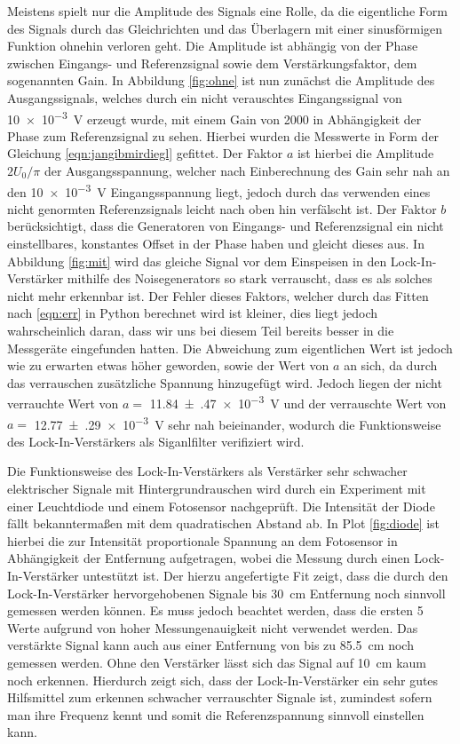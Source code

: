 Meistens spielt nur die Amplitude des Signals eine Rolle, da
die eigentliche Form des Signals durch das Gleichrichten und das Überlagern
mit einer sinusförmigen Funktion ohnehin verloren geht. Die Amplitude ist
abhängig von der Phase zwischen Eingangs- und Referenzsignal
sowie dem Verstärkungsfaktor, dem sogenannten Gain. In Abbildung \ref{fig:ohne}
ist nun zunächst die Amplitude des Ausgangssignals, welches durch
ein nicht verauschtes Eingangssignal von \SI{10e-3}{\volt} erzeugt wurde,
mit einem Gain von 2000 in Abhängigkeit der Phase zum Referenzsignal zu sehen.
Hierbei wurden die Messwerte in Form der Gleichung \eqref{eqn:jangibmirdiegl}
gefittet. Der Faktor $a$ ist hierbei die  Amplitude $2U_0/\pi$ der Ausgangsspannung,
welcher nach Einberechnung des Gain sehr nah an den \SI{10e-3}{\volt}
Eingangsspannung liegt, jedoch durch das verwenden eines nicht genormten
Referenzsignals leicht nach oben hin verfälscht ist. Der Faktor $b$
berücksichtigt, dass die Generatoren von Eingangs- und Referenzsignal
ein nicht einstellbares, konstantes Offset in der Phase haben und gleicht
dieses aus. In Abbildung \ref{fig:mit} wird das gleiche Signal vor dem Einspeisen
in den Lock-In-Verstärker mithilfe des Noisegenerators so stark verrauscht,
dass es als solches nicht mehr erkennbar ist. Der Fehler dieses Faktors,
welcher durch das Fitten nach \eqref{eqn:err} in Python berechnet wird
ist kleiner, dies liegt jedoch wahrscheinlich daran, dass wir uns bei
diesem Teil bereits besser in die Messgeräte eingefunden hatten. Die Abweichung
zum eigentlichen Wert ist jedoch wie zu erwarten etwas höher geworden, sowie
der Wert von $a$ an sich, da durch das verrauschen zusätzliche Spannung hinzugefügt
wird. Jedoch liegen der nicht verrauchte Wert von $a=$ \SI{11.84(47)e-3}{\volt}
und der verrauschte Wert von $a=$ \SI{12.77(29)e-3}{\volt} sehr nah beieinander,
wodurch die Funktionsweise des Lock-In-Verstärkers als Siganlfilter verifiziert wird.

Die Funktionsweise des Lock-In-Verstärkers als Verstärker sehr schwacher
elektrischer Signale mit Hintergrundrauschen wird durch ein Experiment
mit einer Leuchtdiode und einem Fotosensor nachgeprüft. Die Intensität
der Diode fällt bekanntermaßen mit dem quadratischen Abstand ab.
In Plot \ref{fig:diode} ist hierbei die zur Intensität proportionale
Spannung an dem Fotosensor in Abhängigkeit der Entfernung aufgetragen,
wobei die Messung durch einen Lock-In-Verstärker untestützt ist.
Der hierzu angefertigte Fit zeigt, dass die durch den Lock-In-Verstärker
hervorgehobenen Signale bis \SI{30}{\centi\meter} Entfernung noch sinnvoll gemessen werden
können. Es muss jedoch beachtet werden, dass die ersten 5 Werte aufgrund von
hoher Messungenauigkeit nicht verwendet werden.
Das verstärkte Signal kann auch aus einer Entfernung von bis zu
\SI{85.5}{\centi\meter} noch gemessen werden. Ohne den Verstärker lässt sich
das Signal auf \SI{10}{\centi\meter} kaum noch erkennen.
Hierdurch zeigt sich, dass der Lock-In-Verstärker ein sehr gutes Hilfsmittel
zum erkennen schwacher verrauschter Signale ist, zumindest sofern man
ihre Frequenz kennt und somit die Referenzspannung sinnvoll einstellen kann.
